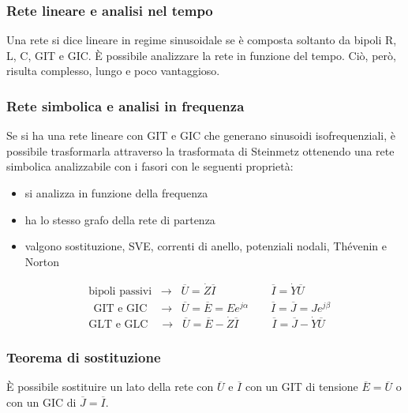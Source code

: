 \documentclass[a4paper]{article}
\begin{document}
\subsubsection*{Rete lineare e analisi nel tempo}
Una rete si dice lineare in regime sinusoidale se è composta soltanto da bipoli R, L, C, GIT e GIC. È possibile analizzare la
rete in funzione del tempo. Ciò, però, risulta complesso, lungo e poco vantaggioso.

\subsubsection*{Rete simbolica e analisi in frequenza}
Se si ha una rete lineare con GIT e GIC che generano sinusoidi isofrequenziali, è possibile trasformarla attraverso la trasformata
di Steinmetz ottenendo una rete simbolica analizzabile con i fasori con le seguenti proprietà:
\begin{itemize}
	\item si analizza in funzione della frequenza
	\item ha lo stesso grafo della rete di partenza
	\item valgono sostituzione, SVE, correnti di anello, potenziali nodali, Thévenin e Norton
\end{itemize}

\begin{align*}
	&\text{bipoli passivi} \;\; \rightarrow \;\; \overline{U} = \dot{Z} \overline{I} \qquad\qquad\quad \overline{I} = \dot{Y} \overline{U} \\
	&\;\, \text{GIT e GIC} \quad \rightarrow \;\; \overline{U} = \overline{E} = Ee^{j\alpha} \qquad \overline{I} = \overline{J} = Je^{j\beta} \\
	&\text{GLT e GLC} \quad \rightarrow \;\; \overline{U} = \overline{E} - \dot{Z} \overline{I} \qquad\quad \overline{I} = \overline{J} - \dot{Y} \overline{U}
\end{align*}

\subsubsection*{Teorema di sostituzione}
È possibile sostituire un lato della rete con \(\overline{U}\) e \(\overline{I}\) con un GIT di tensione \(\overline{E} = \overline{U}\)
o con un GIC di \(\overline{J} = \overline{I}\).
\end{document}
